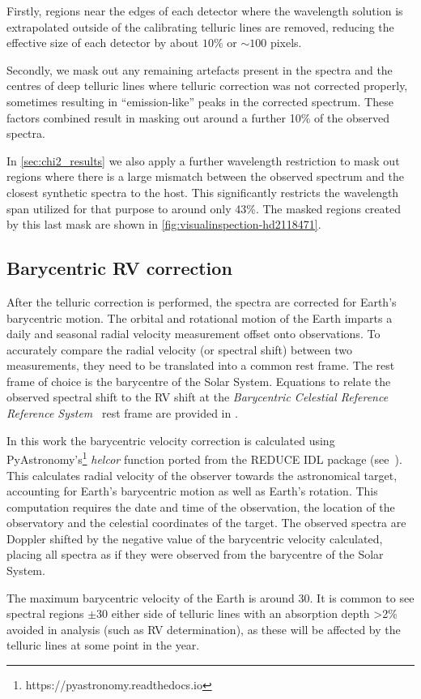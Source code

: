 Firstly, regions near the edges of each detector where the wavelength solution is extrapolated outside of the calibrating telluric lines are removed, reducing the effective size of each detector by about \(10\%\) or \(\sim100\) pixels.

Secondly, we mask out any remaining artefacts present in the spectra and the centres of deep telluric lines where telluric correction was not corrected properly, sometimes resulting in ``emission-like'' peaks in the corrected spectrum.
These factors combined result in masking out around a further 10\% of the observed spectra.

In \cref{sec:chi2_results} we also apply a further wavelength restriction to mask out regions where there is a large mismatch between the observed spectrum and the closest synthetic spectra to the host.
This significantly restricts the wavelength span utilized for that purpose to around only 43\%.
The masked regions created by this last mask are shown in \cref{fig:visualinspection-hd2118471}.




\subsection{Barycentric RV correction}
\label{{subsec:barycentriccorrection}}
After the telluric correction is performed, the spectra are corrected for Earth's barycentric motion. The orbital and rotational motion of the Earth imparts a daily and seasonal radial velocity measurement offset onto observations. To accurately compare the radial velocity (or spectral shift) between two measurements, they need to be translated into a common rest frame. The rest frame of choice is the barycentre of the Solar System.  Equations to relate the observed spectral shift to the RV shift at the \textit{Barycentric Celestial Reference Reference System}~\citep{rickman_transactions_2001} rest frame are provided in \citep{lindegren_fundamental_2003}.

In this work the barycentric velocity correction is calculated using PyAstronomy's\footnote{https://pyastronomy.readthedocs.io} \emph{helcor} function ported from the REDUCE IDL package (see~\citet[][]{piskunov_new_2002}).
This calculates radial velocity of the observer towards the astronomical target, accounting for Earth's barycentric motion as well as Earth's rotation.
This computation requires the date and time of the observation, the location of the observatory and the celestial coordinates of the target.
The observed spectra are Doppler shifted by the negative value of the barycentric velocity calculated, placing all spectra as if they were observed from the barycentre of the Solar System.

The maximum barycentric velocity of the Earth is around 30\kmps{}. It is common to see spectral regions $\pm30$\kmps{} either side of telluric lines with an absorption depth >2\% avoided in analysis (such as RV determination), as these will be affected by the telluric lines at some point in the year.
